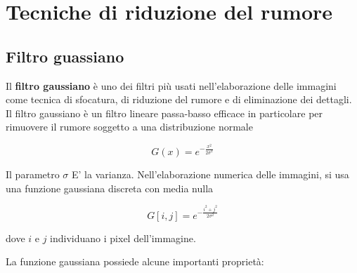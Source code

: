 \documentclass[../main.tex]{subfiles}
\begin{document}
\section{Tecniche di riduzione del rumore}

\subsection{Filtro guassiano}

Il \textbf{filtro gaussiano} è uno dei filtri più usati nell'elaborazione delle immagini come  tecnica di sfocatura, di riduzione del rumore e di eliminazione dei dettagli. Il filtro gaussiano è un filtro lineare passa-basso efficace in particolare per rimuovere il rumore soggetto a una distribuzione normale

\begin{equation}
	G(x) = e^{-\frac{x^2}{2\sigma^2}}
\end{equation}

Il parametro $\sigma$ E' la varianza. Nell'elaborazione numerica delle immagini, si usa una funzione gaussiana discreta con media nulla  \cite{ito_2000}

\begin{equation}
	G[i,j] = e^{-\frac{i^2+j^2}{2\sigma^2}}
\end{equation}

dove $i$ e $j$ individuano i pixel dell'immagine.

La funzione gaussiana possiede alcune importanti proprietà: \cite{wang_2014,getreuer_2013}
\end{document}
